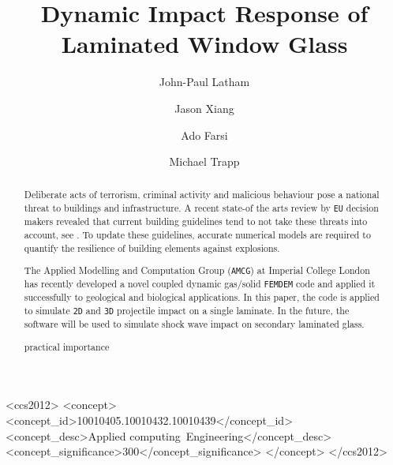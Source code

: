 \documentclass[format=acmtog,12pt,screen=true,review=false,natbib=false,]{acmart}
\title[Implementing a hyper-elastic material law ]{Dynamic Impact Response of Laminated Window Glass}
\author{John-Paul Latham}
\author{Jason Xiang}
\author{Ado Farsi}
\author{Michael Trapp}
\begin{document}
\begin{abstract}
    Deliberate acts of terrorism, criminal activity and malicious behaviour pose a national threat to buildings and infrastructure. A recent state-of the arts review by \texttt{EU} decision makers revealed that current building guidelines tend to not take these threats into account, see \cite{Sto15}. To update these guidelines, accurate numerical models are required to quantify the resilience of building elements against explosions.

    \bigbreak
    The Applied Modelling and Computation Group (\texttt{AMCG}) at Imperial College London has recently developed a novel coupled dynamic gas/solid \texttt{FEMDEM} code and applied it successfully to geological and biological applications. In this paper, the code is applied to simulate \texttt{2D} and \texttt{3D} projectile impact on a single laminate. In the future, the software will be used to simulate shock wave impact on secondary laminated glass.
    
    \bigbreak
    practical importance
\end{abstract}

%
%

\begin{CCSXML}
<ccs2012>
<concept>
<concept_id>10010405.10010432.10010439</concept_id>
<concept_desc>Applied computing~Engineering</concept_desc>
<concept_significance>300</concept_significance>
</concept>
</ccs2012>
\end{CCSXML}

\end{document}
